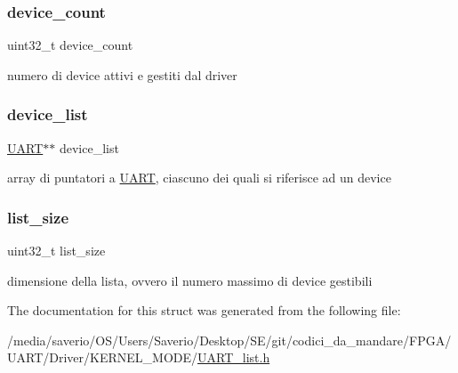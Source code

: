 \subsubsection{\texorpdfstring{device\+\_\+count}{device\_count}}
{\footnotesize\ttfamily uint32\+\_\+t device\+\_\+count}

numero di device attivi e gestiti dal driver \mbox{\label{structUART__list_a851af86c80724adf330596f12617066b}} 
\subsubsection{\texorpdfstring{device\+\_\+list}{device\_list}}
{\footnotesize\ttfamily \hyperlink{structUART}{U\+A\+RT}$\ast$$\ast$ device\+\_\+list}

array di puntatori a \hyperlink{structUART}{U\+A\+RT}, ciascuno dei quali si riferisce ad un device \mbox{\label{structUART__list_aeff61809685e5df1b38aec1d871a49bb}} 
\subsubsection{\texorpdfstring{list\+\_\+size}{list\_size}}
{\footnotesize\ttfamily uint32\+\_\+t list\+\_\+size}

dimensione della lista, ovvero il numero massimo di device gestibili 

The documentation for this struct was generated from the following file\+:\begin{DoxyCompactItemize}
\item 
/media/saverio/\+O\+S/\+Users/\+Saverio/\+Desktop/\+S\+E/git/codici\+\_\+da\+\_\+mandare/\+F\+P\+G\+A/\+U\+A\+R\+T/\+Driver/\+K\+E\+R\+N\+E\+L\+\_\+\+M\+O\+D\+E/\hyperlink{UART__list_8h}{U\+A\+R\+T\+\_\+list.\+h}\end{DoxyCompactItemize}
